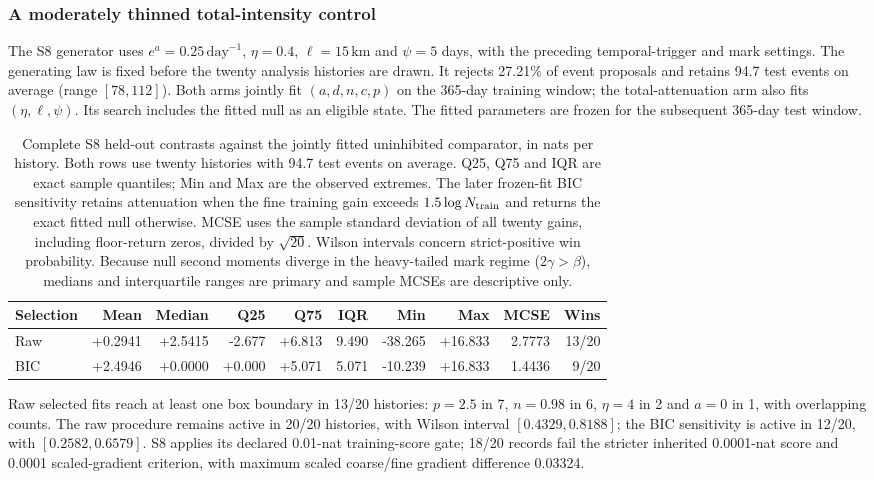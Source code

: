 \subsubsection{A moderately thinned total-intensity control}\label{sec:s8-moderate}
The S8 generator uses $e^a=0.25\,\mathrm{day}^{-1}$, $\eta=0.4$, $\ell=15\,\mathrm{km}$ and $\psi=5$ days, with the preceding temporal-trigger and mark settings. The generating law is fixed before the twenty analysis histories are drawn. It rejects 27.21\% of event proposals and retains 94.7 test events on average (range $[78, 112]$). Both arms jointly fit $(a,d,n,c,p)$ on the 365-day training window; the total-attenuation arm also fits $(\eta,\ell,\psi)$. Its search includes the fitted null as an eligible state. The fitted parameters are frozen for the subsequent 365-day test window.

\begin{table}[htbp]\centering\scriptsize
\setlength{\tabcolsep}{3pt}
\caption{Complete S8 held-out contrasts against the jointly fitted uninhibited comparator, in nats per history. Both rows use twenty histories with 94.7 test events on average. Q25, Q75 and IQR are exact sample quantiles; Min and Max are the observed extremes. The later frozen-fit BIC sensitivity retains attenuation when the fine training gain exceeds $1.5\log N_{\rm train}$ and returns the exact fitted null otherwise. MCSE uses the sample standard deviation of all twenty gains, including floor-return zeros, divided by $\sqrt{20}$. Wilson intervals concern strict-positive win probability. Because null second moments diverge in the heavy-tailed mark regime ($2\gamma>\beta$), medians and interquartile ranges are primary and sample MCSEs are descriptive only.}\label{tab:s8-moderate}
\begin{tabular}{@{}lrrrrrrrrr@{}}\toprule
Selection & Mean & Median & Q25 & Q75 & IQR & Min & Max & MCSE & Wins\\\midrule
Raw & +0.2941 & +2.5415 & -2.677 & +6.813 & 9.490 & -38.265 & +16.833 & 2.7773 & 13/20 \\
BIC & +2.4946 & +0.0000 & +0.000 & +5.071 & 5.071 & -10.239 & +16.833 & 1.4436 & 9/20 \\
\bottomrule\end{tabular}\end{table}

Raw selected fits reach at least one box boundary in 13/20 histories: $p=2.5$ in 7, $n=0.98$ in 6, $\eta=4$ in 2 and $a=0$ in 1, with overlapping counts. The raw procedure remains active in 20/20 histories, with Wilson interval $[0.4329, 0.8188]$; the BIC sensitivity is active in 12/20, with $[0.2582, 0.6579]$. S8 applies its declared 0.01-nat training-score gate; 18/20 records fail the stricter inherited 0.0001-nat score and 0.0001 scaled-gradient criterion, with maximum scaled coarse/fine gradient difference 0.03324.

